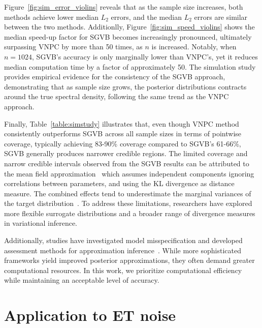 \documentclass[%
 reprint,
 amsmath,amssymb,
 aps,
 nofootinbib,
]{revtex4-2}
\begin{document}



Figure~\ref{fig:sim_error_violins} reveals that as the sample size increases, both methods achieve lower median $L_2$ errors, and the median $L_2$ errors are similar between the two methods. 
Additionlly, Figure~\ref{fig:sim_speed_violins} shows the median speed-up factor for SGVB becomes increasingly pronounced, ultimately surpassing VNPC by more than 50 times, as $n$ is increased. 
Notably, when $n=1024$, SGVB's accuracy is only marginally lower than VNPC's, yet it reduces median computation time by a factor of approximately 50. 
The simulation study provides empirical evidence for the consistency of the SGVB approach, demonstrating that as sample size grows, the posterior distributions contracts around the true spectral density, following the same trend as the VNPC approach. 

Finally, Table~\ref{table:simstudy} illustrates that, even though VNPC method consistently outperforms SGVB across all sample sizes in terms of pointwise coverage, typically achieving 83-90\% coverage compared to SGVB's 61-66\%, SGVB generally produces narrower credible regions.
%
The limited coverage and narrow credible intervals observed from the SGVB results can be attributed to the mean field approximation~\cite{Blei2017} which assumes independent components ignoring correlations between parameters, and using the KL divergence as distance measure. 
The combined effects tend to underestimate the marginal variances of the target distribution~\cite{Blei2006,Wang2005}. 
To address these limitations, researchers have explored more flexible surrogate distributions and a broader range of divergence measures in variational inference\cite{Kingma2013, Blei2017, Rezende2015,Yang2020,Higgins2017}. 

Additionally, studies have investigated model misspecification and developed assessment methods for approximation inference~\cite{Wang2019, yao2018, lee2019, yu2021}.
While more sophisticated frameworks yield improved posterior approximations, they often demand greater computational resources. 
In this work, we prioritize computational efficiency while maintaining an acceptable level of accuracy.



\section{Application to ET noise}
\label{sec:application}
\end{document}
